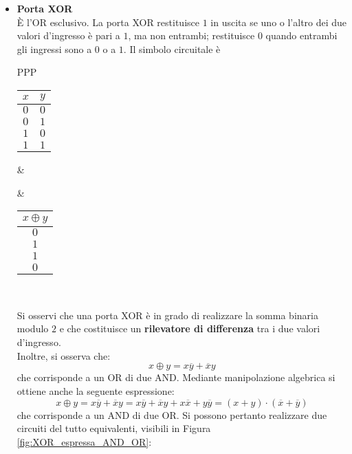 \documentclass[a4paper]{extarticle}
\begin{document}
\begin{itemize}
    \item \textbf{Porta XOR}\\
    È l’OR esclusivo. La porta XOR restituisce \(1\) in uscita se uno o l’altro dei due valori d’ingresso è pari a \(1\), ma non entrambi; restituisce \(0\) quando entrambi gli ingressi sono a \(0\) o a \(1\). Il simbolo circuitale è

    \vspace{1em}
    \noindent
    \begin{tabularx}{\textwidth}{PPP}
    {
        \begin{tabular}{c|c}
             \(x\) & \(y\)\\
             \hline
             $0$ & $0$\\
             $0$ & $1$\\
             $1$ & $0$\\
             $1$ & $1$
        \end{tabular}
    }
    &
    {
    }
    &
    {
        \begin{tabular}{c}
             \(x \oplus y\)\\
             \hline
             $0$\\
             $1$\\
             $1$\\
             $0$
        \end{tabular}
    }\\
    \end{tabularx}
    \vspace{1em}
    \noindent

    \noindent
    Si osservi che una porta XOR è in grado di realizzare la somma binaria modulo \(2\) e che costituisce un \textbf{rilevatore di differenza} tra i due valori d'ingresso.\\
    Inoltre, si osserva che:
    \[x \oplus y = x \overline{y} + \overline{x} y\]
    che corrisponde a un OR di due AND. Mediante manipolazione algebrica si ottiene anche la seguente espressione:
    \[x \oplus y = x \overline{y} + \overline{x} y = x \overline{y} + \overline{x} y + x \overline{x} + y \overline{y} = (x + y) \cdot (\overline{x} + \overline{y})\]
    che corrisponde a un AND di due OR. Si possono pertanto realizzare due circuiti del tutto equivalenti, visibili in Figura \ref{fig:XOR_espressa_AND_OR}:


\end{itemize}
\end{document}
